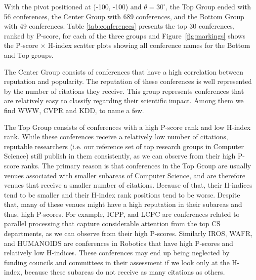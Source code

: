 \documentclass[notitlepage]{svjour3}
\begin{document}
With the pivot positioned at (-100, -100) and $ \theta=30^{\circ} $, the Top Group ended with 56 conferences, the 
Center Group with 689 conferences, and the Bottom Group with 49 conferences. Table 
\ref{tab:conferences} presents the top 30 conferences, ranked by P-score, for each of the three groups
and Figure~\ref{fig:markings} shows the P-score $ \times $ H-index scatter plots showing all conference
names for the Bottom and Top groups.

The Center Group consists of conferences that have a high correlation between reputation and
popularity. The reputation of these conferences is well represented by the number of citations
they receive. This group represents conferences that are relatively easy to classify regarding
their scientific impact. Among them we find WWW, CVPR and KDD, to name a few.

The Top Group consists of conferences with a high P-score rank and low H-index rank. While these conferences
receive a relatively low number of citations, reputable researchers 
(i.e. our reference set of top research groups in Computer Science) still publish 
in them consistently, as we can observe from their high P-score ranks. The primary reason is that
conferences in the Top Group are usually venues associated with smaller subareas of Computer Science, 
and are therefore venues that receive a smaller number of citations. Because of that, their H-indices 
tend to be smaller and their H-index rank positions tend to be worse. Despite that, many of these 
venues might have a high reputation in their subareas and thus, high P-scores. 
For example, ICPP, and LCPC are conferences related to parallel processing that capture
considerable attention from the top CS departments, as we can observe from their high P-scores. 
Similarly IROS, WAFR, and HUMANOIDS are conferences in Robotics that have high P-scores
and relatively low H-indices. These conferences may end up being neglected by funding councils and 
committees in their assessment if we look only at the H-index, because these subareas do not receive 
as many citations as others.

\end{document}
